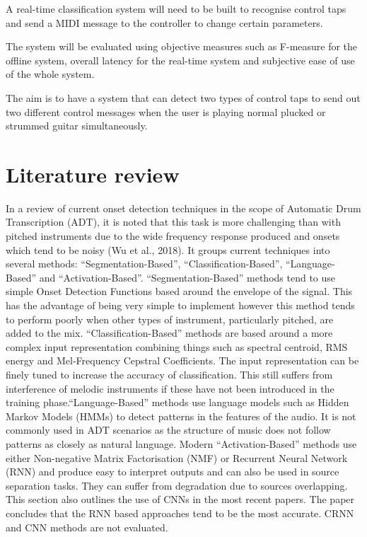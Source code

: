 \documentclass[conference]{IEEEtran}
\begin{document}
A real-time classification system will need to be built to recognise control taps and send a MIDI message to the controller to change certain parameters.

The system will be evaluated using objective measures such as F-measure for the offline system, overall latency for the real-time system and subjective ease of use of the whole system.

The aim is to have a system that can detect two types of control taps to send out two different control messages when the user is playing normal plucked or strummed guitar simultaneously.

\section{Literature review}
In a review of current onset detection techniques in the scope of Automatic Drum Transcription (ADT), it is noted that this task is more challenging than with pitched instruments
due to the wide frequency response produced and onsets which tend to be noisy (Wu et al., 2018). It groups current techniques into several methods: ``Segmentation-Based'', ``Classification-Based'', ``Language-Based''
and ``Activation-Based''. ``Segmentation-Based'' methods tend to use simple Onset Detection Functions based around the envelope of the signal. This has the advantage of being very simple
to implement however this method tends to perform poorly when other types of instrument, particularly pitched, are added to the mix. ``Classification-Based'' methods are based around
a more complex input representation combining things such as spectral centroid, RMS energy and Mel-Frequency Cepstral Coefficients. The input representation can be finely tuned to increase
the accuracy of classification. This still suffers from interference of melodic instruments if these have not been introduced in the training phase.``Language-Based'' methods use language
models such as Hidden Markov Models (HMMs) to detect patterns in the features of the audio. It is not commonly used in ADT scenarios as the structure of music does not follow patterns
as closely as natural language. Modern ``Activation-Based'' methods use either Non-negative Matrix Factorisation (NMF) or Recurrent Neural Network (RNN) and produce easy to interpret
outputs and can also be used in source separation tasks. They can suffer from degradation due to sources overlapping. This section also outlines the use of CNNs in the most recent papers. 
The paper concludes that the RNN based approaches tend to be the most accurate. CRNN and CNN methods are not evaluated. 
\end{document}
